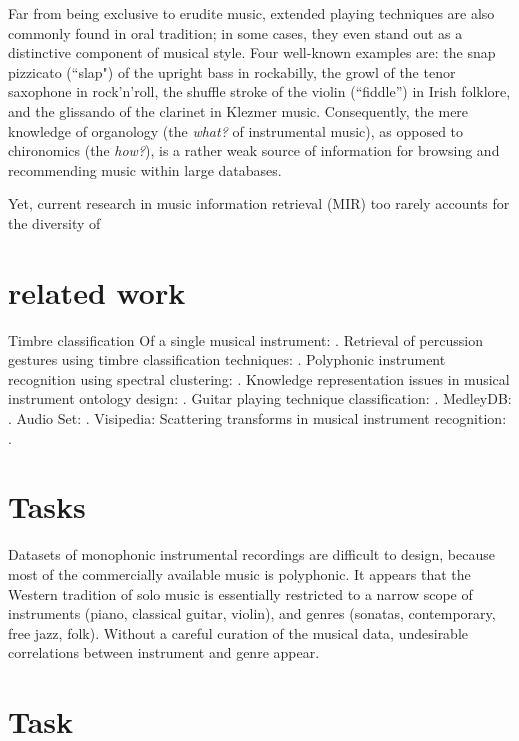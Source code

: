 \documentclass{article}
\begin{document}
Far from being exclusive to erudite music, extended playing techniques are also commonly found in oral tradition; in some cases, they even stand out as a distinctive component of musical style.
Four well-known examples are:
the snap pizzicato (``slap") of the upright bass in rockabilly,
the growl of the tenor saxophone in rock'n'roll,
the shuffle stroke of the violin (``fiddle'') in Irish folklore,
and the glissando of the clarinet in Klezmer music.
Consequently, the mere knowledge of organology (the \emph{what?} of instrumental music), as opposed to chironomics (the \emph{how?}), is a rather weak source of information for browsing and recommending music within large databases.

Yet, current research in music information retrieval (MIR) too rarely accounts for the diversity of 

\section{related work}
Timbre classification Of a single musical instrument: \cite{loureiro2004ismir}.
Retrieval of percussion gestures using timbre classification techniques: \cite{tindale2004ismir}.
Polyphonic instrument recognition using spectral clustering: \cite{martins2007ismir}.
Knowledge representation issues in musical instrument ontology design: \cite{kolozali2011ismir}.
Guitar playing technique classification: \cite{su2014ismir}.
MedleyDB: \cite{bittner2014ismir}.
Audio Set: \cite{gemmeke2017icassp}.
Visipedia: \cite{belongie2015pattern}
Scattering transforms in musical instrument recognition: \cite{tjoa2010ismir,lostanlen2017phd}.

\section{Tasks}

Datasets of monophonic instrumental recordings are difficult to design, because most of the commercially available music is polyphonic.
It appears that the Western tradition of solo music is essentially restricted to a narrow scope of instruments (piano, classical guitar, violin), and genres (sonatas, contemporary, free jazz, folk).
Without a careful curation of the musical data, undesirable correlations between instrument and genre appear.



\section{Task}
\end{document}
